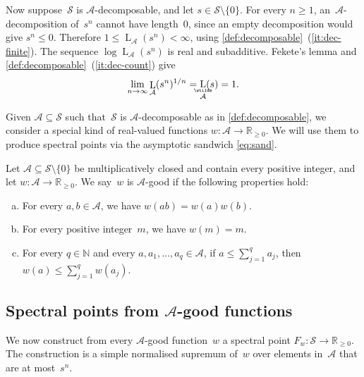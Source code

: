 \documentclass[11pt,letterpaper]{article}
\DeclareMathOperator{\declength}{L}
\DeclareMathOperator{\asympdeclength}{\underaccent{\wtilde}{L}}
\newcommand{\RR}{\mathbb{R}}
\newcommand{\NN}{\mathbb{N}}
\begin{document}
Now suppose~$\mathcal{S}$ is $\mathcal{A}$-decomposable, and let $s \in \mathcal{S} \setminus \{0\}$. For every $n \geq 1$, an~$\mathcal{A}$-decomposition of~$s^n$ cannot have length~$0$, since an empty decomposition would give $s^n \leq 0$. Therefore $1 \leq \declength_{\mathcal{A}}(s^n) < \infty$, using \cref{def:decomposable}~(\ref{it:dec-finite}). The sequence $\log \declength_{\mathcal{A}}(s^n)$ is real and subadditive. Fekete's lemma and \cref{def:decomposable}~(\ref{it:dec-count}) give
\begin{equation}\label{eq:length-limit}
\lim_{n \to \infty} \declength_{\mathcal{A}}(s^n)^{1/n} = \asympdeclength_{\mathcal{A}}(s) = 1.
\end{equation}

Given $\mathcal{A}\subseteq \mathcal{S}$ such that~$\mathcal{S}$ is $\mathcal{A}$-decomposable as in \cref{def:decomposable}, we consider a special kind of real-valued functions $w: \mathcal{A} \to \RR_{\geq0}$. We will use them to produce spectral points via the asymptotic sandwich \eqref{eq:sand}.

\begin{definition}\label{def:w}
Let $\mathcal{A} \subseteq \mathcal{S} \setminus \{0\}$ be multiplicatively closed and contain every positive integer, and let $w : \mathcal{A} \to \RR_{\geq0}$. We say~$w$ is $\mathcal{A}$-good if the following properties hold:
\begin{enumerate}[(a)]
\item\label{it:good-mult} For every $a,b \in \mathcal{A}$, we have $w(ab) = w(a)w(b)$.
\item\label{it:good-norm} For every positive integer~$m$, we have $w(m) = m$.
\item\label{it:good-sub} For every $q \in \NN$ and every $a, a_1, \ldots, a_q \in \mathcal{A}$, if $a \leq \sum_{j=1}^q a_j$, then $w(a) \leq \sum_{j=1}^q w(a_j)$.
\end{enumerate}
\end{definition}

\subsection{Spectral points from \texorpdfstring{$\mathcal{A}$}{A}-good functions}

We now construct from every $\mathcal{A}$-good function~$w$ a spectral point $F_w : \mathcal{S} \to \RR_{\geq0}$. The construction is a simple normalised supremum of~$w$ over elements in~$\mathcal{A}$ that are at most~$s^n$.
\end{document}
